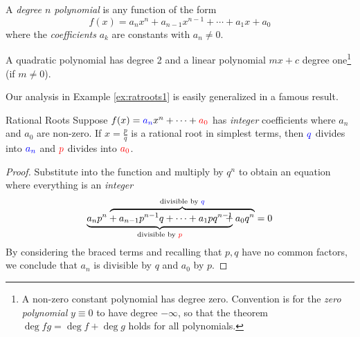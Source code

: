 \goodbreak

\begin{defn}{}{}
	A \emph{degree $n$ polynomial} is any function of the form
	\[
		f(x)=a_nx^n+a_{n-1}x^{n-1}+\cdots+a_1x+a_0
	\]
	where the \emph{coefficients} $a_k$ are constants with $a_n\neq 0$.
\end{defn}

A quadratic polynomial has degree 2 and a linear polynomial $mx+c$ degree one\footnote{A non-zero constant polynomial has degree zero. Convention is for the \emph{zero polynomial} $y\equiv 0$ to have degree $-\infty$, so that the theorem $\operatorname{deg} fg=\operatorname{deg} f+\operatorname{deg} g$ holds for all polynomials.} (if $m\neq 0$).\smallbreak

Our analysis in Example \ref{ex:ratroots1} is easily generalized in a famous result.

\begin{thm}{Rational Roots}{}
	Suppose $f(x)=\textcolor{blue}{a_n}x^n+\cdots+\textcolor{red}{a_0}$ has \emph{integer} coefficients where $a_n$ and $a_0$ are non-zero. If $x=\frac pq$ is a rational root in simplest terms, then $\textcolor{blue}{q}$ divides into $\textcolor{blue}{a_n}$ and $\textcolor{red}{p}$ divides into $\textcolor{red}{a_0}$.
\end{thm}

\begin{proof}
	Substitute into the function and multiply by $q^n$ to obtain an equation where everything is an \emph{integer}\vspace{-13pt}
	\[
		\underbrace{a_np^n+a_{n-1}p^{n-1}q+\cdots+a_1pq^{n-1}}_{\text{divisible by $\textcolor{red}{p}$}} \hspace{-129pt} \overbrace{\phantom{a_{n-1}p^{n-1}q+\cdots+a_1pq^{n-1}}+a_0q^n}^{\text{divisible by $\textcolor{blue}{q}$}}=0
	\]
	By considering the braced terms and recalling that $p,q$ have no common factors, we conclude that $a_n$ is divisible by $q$ and $a_0$ by $p$.
\end{proof}


